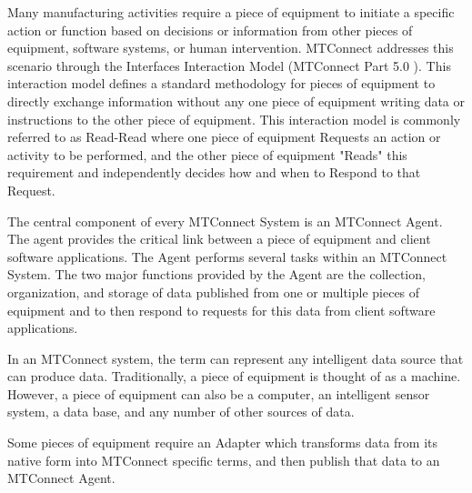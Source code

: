 Many manufacturing activities require a piece of equipment to initiate a specific action or function based on decisions or information from other pieces of equipment, software systems, or human intervention. MTConnect addresses this scenario through the Interfaces Interaction Model (MTConnect Part 5.0 \cite{MTCPart5}).   This interaction model defines a standard methodology for pieces of equipment to directly exchange information without any one piece of equipment writing data or instructions to the other piece of equipment. This interaction model is commonly referred to as Read-Read where one piece of equipment Requests an action or activity to be performed, and the other piece of equipment "Reads" this requirement and independently decides how and when to Respond to that Request. 

The central component of every MTConnect System is an MTConnect \gls{Agent}.  The agent provides the critical link between a piece of equipment and client software applications. The \gls{Agent} performs several tasks within an MTConnect System.   The two major functions provided by the \gls{Agent} are the collection, organization, and storage of data published from one or multiple pieces of equipment and to then respond to requests for this data from client software applications. 


\FloatBarrier
 
In an MTConnect system, the term  can represent any intelligent data source that can produce data.  Traditionally, a piece of equipment is thought of as a machine. However, a piece of equipment can also be a computer, an intelligent sensor system, a data base, and any number of other sources of data. 
 
Some pieces of equipment require an Adapter which transforms data from its native form into MTConnect specific terms, and then publish that data to an MTConnect Agent.
